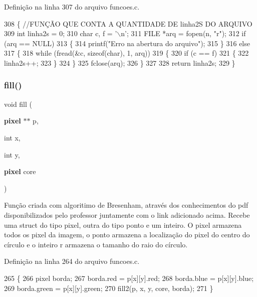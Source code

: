 Definição na linha 307 do arquivo funcoes.\+c.


\begin{DoxyCode}
308 \{ \textcolor{comment}{//FUNÇÃO QUE CONTA A QUANTIDADE DE linha2S DO ARQUIVO}
309     \textcolor{keywordtype}{int} linha2s = 0;
310     \textcolor{keywordtype}{char} c, f = \textcolor{charliteral}{'\(\backslash\)n'};
311     FILE *arq = fopen(n, \textcolor{stringliteral}{"r"});
312     \textcolor{keywordflow}{if} (arq == NULL)
313     \{
314         printf(\textcolor{stringliteral}{"Erro na abertura do arquivo"});
315     \}
316     \textcolor{keywordflow}{else}
317     \{
318         \textcolor{keywordflow}{while} (fread(&c, \textcolor{keyword}{sizeof}(\textcolor{keywordtype}{char}), 1, arq))
319         \{
320             \textcolor{keywordflow}{if} (c == f)
321             \{
322                 linha2s++;
323             \}
324         \}
325         fclose(arq);
326     \}
327 
328     \textcolor{keywordflow}{return} linha2s;
329 \}
\end{DoxyCode}
\mbox{\label{funcoes_8c_a5d0b715f4373b4c5573821288cc65e62}} 
\subsubsection{fill()}
{\footnotesize\ttfamily void fill (\begin{DoxyParamCaption}\item[{\textbf{ pixel} $\ast$$\ast$}]{p,  }\item[{int}]{x,  }\item[{int}]{y,  }\item[{\textbf{ pixel}}]{core }\end{DoxyParamCaption})}



Função criada com algoritimo de Bresenham, através dos conhecimentos do pdf disponibilizados pelo professor juntamente com o link adicionado acima. Recebe uma struct do tipo pixel, outra do tipo ponto e um inteiro. O pixel armazena todos os pixel da imagem, o ponto armazena a localização do pixel do centro do círculo e o inteiro r armazena o tamanho do raio do círculo. 



Definição na linha 264 do arquivo funcoes.\+c.


\begin{DoxyCode}
265 \{
266     pixel borda;
267     borda.red = p[x][y].red;
268     borda.blue = p[x][y].blue;
269     borda.green = p[x][y].green;
270     fill2(p, x, y, core, borda);
271 \}
\end{DoxyCode}
\mbox{\label{funcoes_8c_ac22fa8db2f2e7276a73a71694409531f}} 
